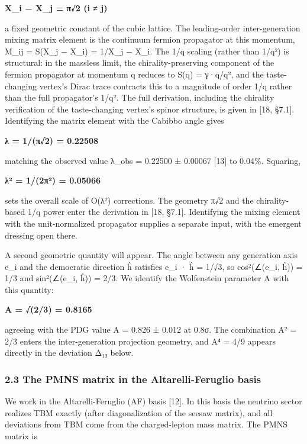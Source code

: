 \documentclass[
]{article}
\begin{document}
\textbf{\textbar X\_i − X\_j\textbar{} = π√2 (i ≠ j)}

a fixed geometric constant of the cubic lattice. The leading-order
inter-generation mixing matrix element is the continuum fermion
propagator at this momentum, \textbar M\_ij\textbar{} = \textbar S(X\_j
− X\_i)\textbar{} = 1/\textbar X\_j − X\_i\textbar. The
1/\textbar q\textbar{} scaling (rather than 1/\textbar q\textbar²) is
structural: in the massless limit, the chirality-preserving component of
the fermion propagator at momentum q reduces to S(q) = γ·q/q², and the
taste-changing vertex's Dirac trace contracts this to a magnitude of
order 1/\textbar q\textbar{} rather than the full propagator's
1/\textbar q\textbar². The full derivation, including the chirality
verification of the taste-changing vertex's spinor structure, is given
in {[}18, §7.1{]}. Identifying the matrix element with the Cabibbo angle
gives

\textbf{λ = 1/(π√2) = 0.22508}

matching the observed value λ\_obs = 0.22500 ± 0.00067 {[}13{]} to
0.04\%. Squaring,

\textbf{λ² = 1/(2π²) = 0.05066}

sets the overall scale of O(λ²) corrections. The geometry π√2 and the
chirality-based 1/\textbar q\textbar{} power enter the derivation in
{[}18, §7.1{]}. Identifying the mixing element with the unit-normalized
propagator supplies a separate input, with the emergent dressing open
there.

A second geometric quantity will appear. The angle between any
generation axis e\_i and the democratic direction ĥ satisfies e\_i · ĥ =
1/√3, so cos²(∠(e\_i, ĥ)) = 1/3 and sin²(∠(e\_i, ĥ)) = 2/3. We identify
the Wolfenstein parameter A with this quantity:

\textbf{A = √(2/3) = 0.8165}

agreeing with the PDG value A = 0.826 ± 0.012 at 0.8σ. The combination
A² = 2/3 enters the inter-generation projection geometry, and A⁴ = 4/9
appears directly in the deviation Δ₁₃ below.

\hypertarget{the-pmns-matrix-in-the-altarelli-feruglio-basis}{%
\subsubsection{2.3 The PMNS matrix in the Altarelli-Feruglio
basis}\label{the-pmns-matrix-in-the-altarelli-feruglio-basis}}

We work in the Altarelli-Feruglio (AF) basis {[}12{]}. In this basis the
neutrino sector realizes TBM exactly (after diagonalization of the
seesaw matrix), and all deviations from TBM come from the charged-lepton
mass matrix. The PMNS matrix is
\end{document}
